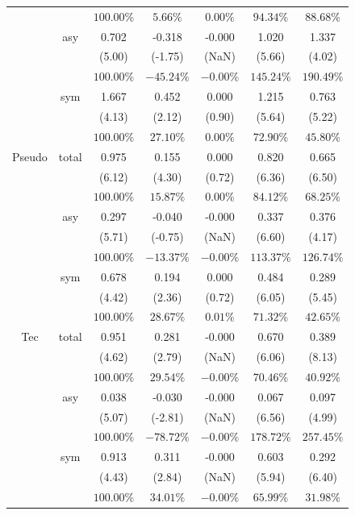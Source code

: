 \documentclass[
]{article}
\begin{document}
\begin{table}[H]
{\begin{tabular}{ccccccc}
   &  & $100.00\%$ & $5.66\%$ & $0.00\%$ & $94.34\%$ & $88.68\%$ \\ 
   & asy & 0.702 & -0.318 & -0.000 & 1.020 & 1.337 \\ 
   &  & (5.00) & (-1.75) & (NaN) & (5.66) & (4.02) \\ 
   &  & $100.00\%$ & $-45.24\%$ & $-0.00\%$ & $145.24\%$ & $190.49\%$ \\ 
   & sym & 1.667 & 0.452 & 0.000 & 1.215 & 0.763 \\ 
   &  & (4.13) & (2.12) & (0.90) & (5.64) & (5.22) \\ 
   &  & $100.00\%$ & $27.10\%$ & $0.00\%$ & $72.90\%$ & $45.80\%$ \\ 
   \hline 
Pseudo & total & 0.975 & 0.155 & 0.000 & 0.820 & 0.665 \\ 
   &  & (6.12) & (4.30) & (0.72) & (6.36) & (6.50) \\ 
   &  & $100.00\%$ & $15.87\%$ & $0.00\%$ & $84.12\%$ & $68.25\%$ \\ 
   & asy & 0.297 & -0.040 & -0.000 & 0.337 & 0.376 \\ 
   &  & (5.71) & (-0.75) & (NaN) & (6.60) & (4.17) \\ 
   &  & $100.00\%$ & $-13.37\%$ & $-0.00\%$ & $113.37\%$ & $126.74\%$ \\ 
   & sym & 0.678 & 0.194 & 0.000 & 0.484 & 0.289 \\ 
   &  & (4.42) & (2.36) & (0.72) & (6.05) & (5.45) \\ 
   &  & $100.00\%$ & $28.67\%$ & $0.01\%$ & $71.32\%$ & $42.65\%$ \\ 
   \hline 
Tec & total & 0.951 & 0.281 & -0.000 & 0.670 & 0.389 \\ 
   &  & (4.62) & (2.79) & (NaN) & (6.06) & (8.13) \\ 
   &  & $100.00\%$ & $29.54\%$ & $-0.00\%$ & $70.46\%$ & $40.92\%$ \\ 
   & asy & 0.038 & -0.030 & -0.000 & 0.067 & 0.097 \\ 
   &  & (5.07) & (-2.81) & (NaN) & (6.56) & (4.99) \\ 
   &  & $100.00\%$ & $-78.72\%$ & $-0.00\%$ & $178.72\%$ & $257.45\%$ \\ 
   & sym & 0.913 & 0.311 & -0.000 & 0.603 & 0.292 \\ 
   &  & (4.43) & (2.84) & (NaN) & (5.94) & (6.40) \\ 
   &  & $100.00\%$ & $34.01\%$ & $-0.00\%$ & $65.99\%$ & $31.98\%$ \\ 
   \hline 
\end{tabular}
}
\end{table}
\newpage
\end{document}
